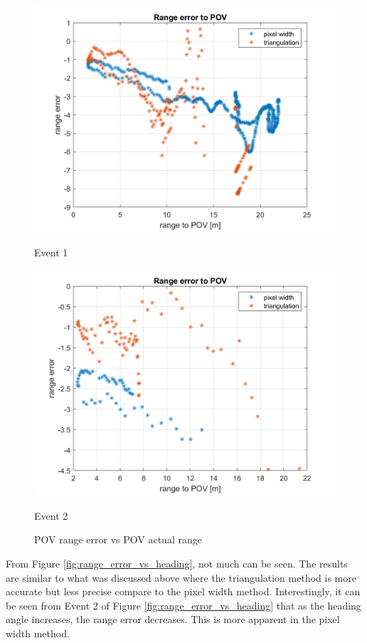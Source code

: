 \begin{figure}[H]
\begin{minipage}[b]{0.49\textwidth}
    \includegraphics[width=\textwidth]{FiguresMat/range_error_long_10794257.png}
    \caption*{Event 1}
\end{minipage}
\begin{minipage}[b]{0.50\textwidth}
    \includegraphics[width=\textwidth]{FiguresMat/range_error_long_116147345.png}
    \caption*{Event 2}
\end{minipage}
\caption{POV range error vs POV actual range}
\label{fig:range_error_vs_radar}
\end{figure}

From Figure \ref{fig:range_error_vs_heading}, not much can be seen. The results are similar to what was discussed above where the triangulation method is more accurate but less precise compare to the pixel width method. Interestingly, it can be seen from Event 2 of Figure \ref{fig:range_error_vs_heading} that as the heading angle increases, the range error decreases. This is more apparent in the pixel width method.

